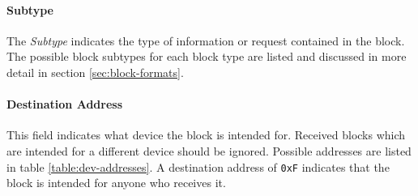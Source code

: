 \paragraph{Subtype}
The \emph{Subtype} indicates the type of information or request contained in the block. The possible block subtypes for
each block type are listed and discussed in more detail in section \ref{sec:block-formats}.

\paragraph{Destination Address}
This field indicates what device the block is intended for. Received blocks which are intended for a different device
should be ignored. Possible addresses are listed in table \ref{table:dev-addresses}. A destination address of
\lstinline{0xF} indicates that the block is intended for anyone who receives it.
